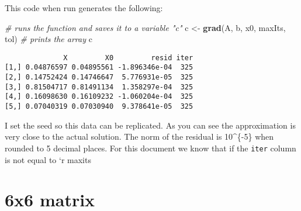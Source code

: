 \documentclass[]{article}
\newenvironment{Shaded}{\begin{snugshade}}{\end{snugshade}}
\newcommand{\KeywordTok}[1]{\textcolor[rgb]{0.13,0.29,0.53}{\textbf{#1}}}
\newcommand{\DataTypeTok}[1]{\textcolor[rgb]{0.13,0.29,0.53}{#1}}
\newcommand{\DecValTok}[1]{\textcolor[rgb]{0.00,0.00,0.81}{#1}}
\newcommand{\FloatTok}[1]{\textcolor[rgb]{0.00,0.00,0.81}{#1}}
\newcommand{\StringTok}[1]{\textcolor[rgb]{0.31,0.60,0.02}{#1}}
\newcommand{\CommentTok}[1]{\textcolor[rgb]{0.56,0.35,0.01}{\textit{#1}}}
\newcommand{\OperatorTok}[1]{\textcolor[rgb]{0.81,0.36,0.00}{\textbf{#1}}}
\newcommand{\NormalTok}[1]{#1}
\begin{document}
This code when run generates the following:

\begin{Shaded}
\begin{Highlighting}[]
\CommentTok{# runs the function and saves it to a variable "c"}
\NormalTok{c <-}\StringTok{ }\KeywordTok{grad}\NormalTok{(A, b, x0, maxIts, tol)}
\CommentTok{# prints the array }
\NormalTok{c }
\end{Highlighting}
\end{Shaded}

\begin{verbatim}
              X         X0         resid iter
[1,] 0.04876597 0.04895561 -1.896346e-04  325
[2,] 0.14752424 0.14746647  5.776931e-05  325
[3,] 0.81504717 0.81491134  1.358297e-04  325
[4,] 0.16098630 0.16109232 -1.060204e-04  325
[5,] 0.07040319 0.07030940  9.378641e-05  325
\end{verbatim}

I set the seed so this data can be replicated. As you can see the
approximation is very close to the actual solution. The norm of the
residual is 10\^{}\{-5\} when rounded to 5 decimal places. For this
document we know that if the \texttt{iter} column is not equal to `r
maxits

\section{6x6 matrix}\label{x6-matrix}

\begin{Shaded}
\end{Shaded}
\end{document}
